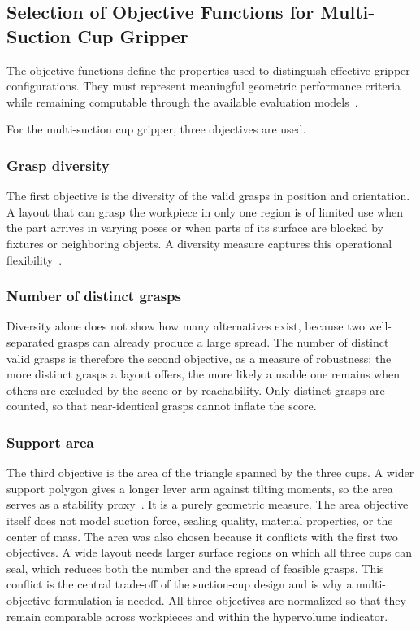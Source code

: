 \subsection{Selection of Objective Functions for Multi-Suction Cup Gripper}
\label{subsec:methodology_objectives}

The objective functions define the properties used to distinguish effective gripper configurations. They must represent meaningful geometric
performance criteria while remaining computable through the available evaluation models~\cite{Todescato,Wolniakowski2017Task}.

For the multi-suction cup gripper, three objectives are used.

\subsubsection{Grasp diversity}
The first objective is the diversity of the valid grasps in position and orientation. A layout
that can grasp the workpiece in only one region is of limited use when the part arrives in varying
poses or when parts of its surface are blocked by fixtures or neighboring objects. A diversity
measure captures this operational flexibility~\cite{Bo2023A,Pinskier2024Diversity-Based}.

\subsubsection{Number of distinct grasps}
\label{subsubsec:normalized_grasp_count}
Diversity alone does not show how many alternatives exist, because two well-separated grasps can
already produce a large spread. The number of distinct valid grasps is therefore the second
objective, as a measure of robustness: the more distinct grasps a layout offers, the more likely a
usable one remains when others are excluded by the scene or by reachability. Only distinct grasps
are counted, so that near-identical grasps cannot inflate the score.

\subsubsection{Support area}
The third objective is the area of the triangle spanned by the three cups. A wider support polygon
gives a longer lever arm against tilting moments, so the area serves as a stability proxy~\cite{Mantriota_2007}. It is a
purely geometric measure. The area objective itself does not model suction force, sealing quality,
material properties, or the center of mass. The area was also chosen because it
conflicts with the first two objectives. A wide layout needs larger surface regions on which all
three cups can seal, which reduces both the number and the spread of feasible grasps. This conflict
is the central trade-off of the suction-cup design and is why a multi-objective formulation is
needed. All three objectives are normalized so that they remain comparable across workpieces and
within the hypervolume indicator.

